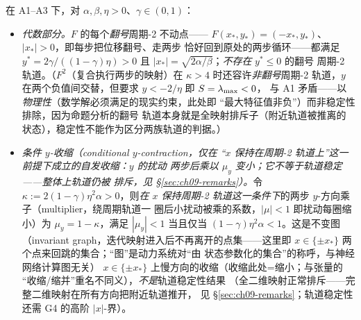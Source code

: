 \begin{proposition}
在 A1--A3 下，对 $\alpha,\beta,\eta>0$、$\gamma\in(0,1)$：
\begin{itemize}
  \item[(a)] \emph{代数部分。}$F$ 的每个\emph{翻号}周期-2 不动点——
        $F(x_*,y_*)=(-x_*,y_*)$、$|x_*|>0$，即每步把位移翻号、走两步
        恰好回到原处的两步循环——都满足
        $y^{*}=2\gamma/((1-\gamma)\eta)>0$ 且
        $|x_*|=\sqrt{2\alpha/\beta}$；\emph{不存在} $y^{*}\le0$ 的翻号
        周期-2 轨道。（$F^2$（复合执行两步的映射）在 $\kappa>4$ 时还容许\emph{非翻号}周期-2
        轨道，$y$ 在两个负值间交替，但要求 $y<-2/\eta$ 即 $S=\lambda_{\max}<0$，
        与 A1 矛盾——以\emph{物理性}（数学解必须满足的现实约束，此处即
        “最大特征值非负”）而非稳定性排除，因为命题分析的翻号
        轨道本身就是全映射排斥子（附近轨道被推离的状态），稳定性不能作为区分两族轨道的判据。）
  \item[(b)] \emph{条件 $y$-收缩（conditional $y$-contraction，仅在
        “$x$ 保持在周期-2 轨道上”这一前提下成立的自发收缩：$y$ 的扰动
        两步后乘以 $\mu_y$ 变小；它不等于轨道稳定——整体上轨道仍被
        排斥，见 \S\ref{sec:ch09-remarks}）。}令
        $\kappa:=2(1-\gamma)\eta^2\alpha>0$，则\emph{在 $x$ 保持周期-2
        轨道这一条件下}的两步 $y$-方向乘子（multiplier，绕周期轨道一
        圈后小扰动被乘的系数，$|\mu|<1$ 即扰动每圈缩小）为 $\mu_y=1-\kappa$，满足
        $|\mu_y|<1$ 当且仅当 $(1-\gamma)\eta^2\alpha<1$。这是不变图（invariant graph，迭代映射进入后不再离开的点集——这里即
        $x\in\{\pm x_*\}$ 两个点来回跳的集合；“图”是动力系统对“由
        状态参数化的集合”的称呼，与神经网络计算图无关）
        $x\in\{\pm x_*\}$ 上慢方向的收缩（收缩此处=缩小；与张量的
        ``收缩/缩并''重名不同义），\emph{不是}轨道稳定性结果
        （全二维映射正常排斥——完整二维映射在所有方向把附近轨道推开，
        见 \S\ref{sec:ch09-remarks}；轨道稳定性
        还需 G4 的高阶 $|x|$-界）。
\end{itemize}
\end{proposition}


